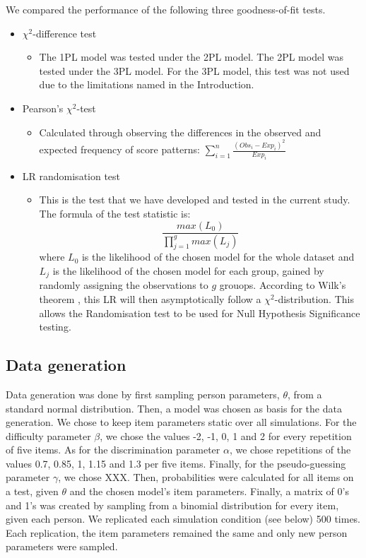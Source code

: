 \documentclass[Royal,sageapa,times,doublespace]{sagej}
\begin{document}
We compared the performance of the following three goodness-of-fit tests.
\begin{itemize}
\item{$\chi^2$-difference test}
	\begin{itemize}
	\item{The 1PL model was tested under the 2PL model. The 2PL model was tested under the 3PL model. For the 3PL model, this test was not used due to the limitations named in the Introduction.}
	\end{itemize}
\item{Pearson's $\chi^2$-test}
	\begin{itemize}
	\item{Calculated through observing the differences in the observed and expected frequency of score patterns: $\sum_{i = 1}^{n}\frac{(Obs_i - Exp_i)^2}{Exp_i}$}
	\end{itemize}
\item{LR randomisation test}
	\begin{itemize}
	\item{This is the test that we have developed and tested in the current study. The formula of the test statistic is:
	\begin{equation}
		\frac{max(L_0)}{\prod_{j = 1}^g max(L_j)}
	\end{equation} where $L_0$ is the likelihood of the chosen model for the whole dataset and $L_j$ is the likelihood of the chosen model for each group, gained by randomly assigning the observations to $g$ grouops. According to Wilk's theorem \cite{willkth}, this LR will then asymptotically follow a $\chi^2$-distribution. This allows the Randomisation test to be used for Null Hypothesis Significance testing.} 
	\end{itemize}
\end{itemize}

\subsection{Data generation}
Data generation was done by first sampling person parameters, $\theta$, from a standard normal distribution. Then, a model was chosen as basis for the data generation. We chose to keep item parameters static over all simulations. For the difficulty parameter $\beta$, we chose the values -2, -1, 0, 1 and 2 for every repetition of five items. As for the discrimination parameter $\alpha$, we chose repetitions of the values 0.7, 0.85, 1, 1.15 and 1.3 per five items. Finally, for the pseudo-guessing parameter $\gamma$, we chose XXX. Then, probabilities were calculated for all items on a test, given $\theta$ and the chosen model's item parameters. Finally, a matrix of 0's and 1's was created by sampling from a binomial distribution for every item, given each person. We replicated each simulation condition (see below) 500 times. Each replication, the item parameters remained the same and only new person parameters were sampled.
\end{document}

